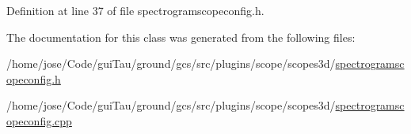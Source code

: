 Definition at line 37 of file spectrogramscopeconfig.\-h.



The documentation for this class was generated from the following files\-:\begin{DoxyCompactItemize}
\item 
/home/jose/\-Code/gui\-Tau/ground/gcs/src/plugins/scope/scopes3d/\hyperlink{spectrogramscopeconfig_8h}{spectrogramscopeconfig.\-h}\item 
/home/jose/\-Code/gui\-Tau/ground/gcs/src/plugins/scope/scopes3d/\hyperlink{spectrogramscopeconfig_8cpp}{spectrogramscopeconfig.\-cpp}\end{DoxyCompactItemize}
